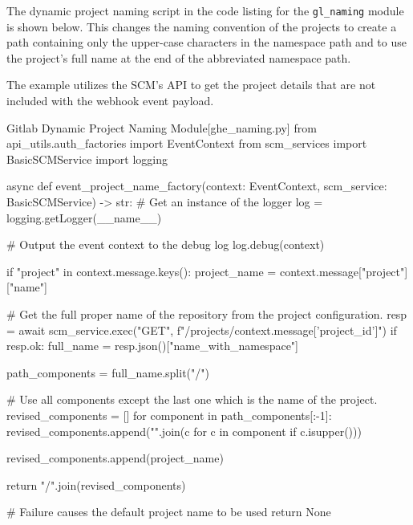 The dynamic project naming script in the code listing for the \texttt{gl\_naming}
module is shown below.  This changes the naming convention of the projects to create
a path containing only the upper-case characters in the namespace path and to use
the project's full name at the end of the abbreviated namespace path.

The example utilizes the SCM's API to get the project details that are not included
with the webhook event payload.\\

\begin{code}{Gitlab Dynamic Project Naming Module}{[ghe\_naming.py]}{}
from api_utils.auth_factories import EventContext
from scm_services import BasicSCMService
import logging

async def event_project_name_factory(context: EventContext, scm_service: BasicSCMService) -> str:
    # Get an instance of the logger
    log = logging.getLogger(__name__)

    # Output the event context to the debug log
    log.debug(context)

    if "project" in context.message.keys():
        project_name = context.message["project"]["name"]

        # Get the full proper name of the repository from the project configuration.
        resp = await scm_service.exec("GET", f"/projects/{context.message['project_id']}")
        if resp.ok:
            full_name = resp.json()["name_with_namespace"]

            path_components = full_name.split("/")

            # Use all components except the last one which is the name of the project.
            revised_components = []
            for component in path_components[:-1]:
                revised_components.append("".join(c for c in component if c.isupper()))
            
            revised_components.append(project_name)

            return "/".join(revised_components)


    # Failure causes the default project name to be used
    return None

\end{code}
